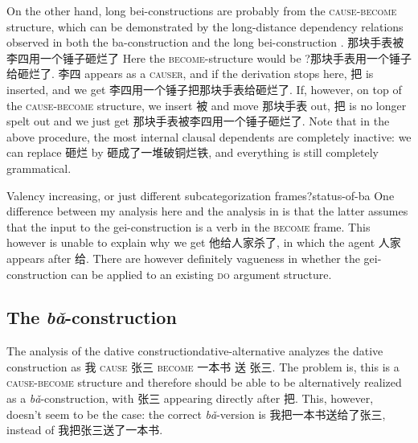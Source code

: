 \documentclass[UTF8, a4paper, oneside, scheme=plain, 12pt]{ctexrep}
\newcommand*{\citesec}[1]{\S~{#1}}
\newcommand*{\citepage}[1]{p.~{#1}}
\newcommand{\form}[1]{\emph{#1}}
\newcommand*{\category}[1]{\textsc{#1}}
\begin{document}
On the other hand, long bei-constructions are probably 
from the \category{cause}-\category{become} structure,
which can be demonstrated by the long-distance dependency relations 
observed in both the ba-construction  
and the long bei-construction
\citep[\citesec{4.2.1.5}]{huang2013}.
那块手表被李四用一个锤子砸烂了 
Here the \category{become}-structure would be 
?那块手表用一个锤子给砸烂了. 
李四 appears as a \category{causer},
and if the derivation stops here, 
把 is inserted, and we get 李四用一个锤子把那块手表给砸烂了.
If, however, on top of the \category{cause}-\category{become} structure, 
we insert 被 and move 那块手表 out, 
把 is no longer spelt out 
and we just get 那块手表被李四用一个锤子砸烂了.
Note that in the above procedure, 
the most internal clausal dependents are completely inactive: 
we can replace 砸烂 by 砸成了一堆破铜烂铁, 
and everything is still completely grammatical.

\begin{infobox}{Valency increasing, or just different subcategorization frames?}{status-of-ba}
    One difference between my analysis here and the analysis in \citet[\citepage{202}]{deng2010formal}
    is that the latter assumes that the input to the gei-construction 
    is a verb in the \category{become} frame.
    This however is unable to explain why we get 他给人家杀了,
    in which the agent 人家 appears after 给.
    There are however definitely vagueness in whether 
    the gei-construction can be applied to an existing \category{do} argument structure.
\end{infobox}


\subsection{The \form{bǎ}-construction}\label{sec:verb-phrase.object.ba}

\begin{infobox}{The analysis of the dative construction}{dative-alternative}
    \citet[\citepage{112}]{deng2010formal} analyzes the dative construction 
    as 我 \category{cause} 张三 \category{become} 一本书 送 张三.
    The problem is, this is a \category{cause}-\category{become} structure 
    and therefore should be able to be alternatively 
    realized as a \form{bǎ}-construction,
    with 张三 appearing directly after 把.
    This, however, doesn't seem to be the case: 
    the correct \form{bǎ}-version is 我把一本书送给了张三,
    instead of 我把张三送了一本书.
\end{infobox}
\end{document}
